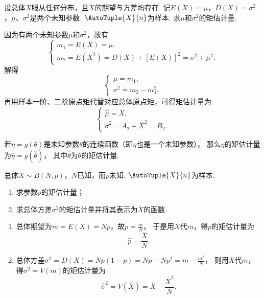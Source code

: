 \begin{example}
设总体\(X\)服从任何分布，且\(X\)的期望与方差均存在.
记\(E(X)=\mu\)，\(D(X)=\sigma^2\)，\(\mu\)、\(\sigma^2\)是两个未知参数.
\(\AutoTuple{X}{n}\)为样本.
求\(\mu\)和\(\sigma^2\)的矩估计量.
\begin{solution}
因为有两个未知参数\(\mu\)和\(\sigma^2\)，故有\[
	\left\{ \begin{array}{l}
		m_1=E(X)=\mu, \\
		m_2=E(X^2)=D(X)+[E(X)]^2=\sigma^2+\mu^2.
	\end{array} \right.
\]
解得\[
	\left\{ \begin{array}{l}
		\mu=m_1, \\
		\sigma^2=m_2-m_1^2.
	\end{array} \right.
\]
再用样本一阶、二阶原点矩代替对应总体原点矩，可得矩估计量为\[
	\left\{ \begin{array}{l}
		\hat{\mu}=\overline{X}, \\
		\hat{\sigma}^2=A_2-\overline{X}^2=B_2.
	\end{array} \right.
\]
\end{solution}
\end{example}

\begin{theorem}
若\(\eta = g(\theta)\)是未知参数\(\theta\)的连续函数（即\(\eta\)也是一个未知参数），
那么\(\eta\)的矩估计量为\(\hat{\eta}=g(\hat{\theta})\)，
其中\(\hat{\theta}\)为\(\theta\)的矩估计量.
\end{theorem}

\begin{example}
总体\(X \sim B(N,p)\)，\(N\)已知，而\(p\)未知.
\(\AutoTuple{X}{n}\)为样本.
\begin{enumerate}
	\item 求参数\(p\)的矩估计量；
	\item 求总体方差\(\sigma^2\)的矩估计量并将其表示为\(\overline{X}\)的函数.
\end{enumerate}
\begin{solution}
\begin{enumerate}
	\item 总体期望为\(m=E(X)=Np\)，故\(p=\frac{m}{N}\)，
	于是用\(\overline{X}\)代\(m\)，得\(p\)的矩估计量为\[
		\hat{p}=\frac{\overline{X}}{N}.
	\]
	\item 总体方差\(\sigma^2=D(X)=Np(1-p)=Np-Np^2=m-\frac{m^2}{N}\)，
	则用\(\overline{X}\)代\(m\)，得\(\sigma^2=V(m)\)的矩估计量为\[
		\hat{\sigma}^2=V(\overline{X})=\overline{X}-\frac{\overline{X}^2}{N}.
	\]
\end{enumerate}
\end{solution}
\end{example}

